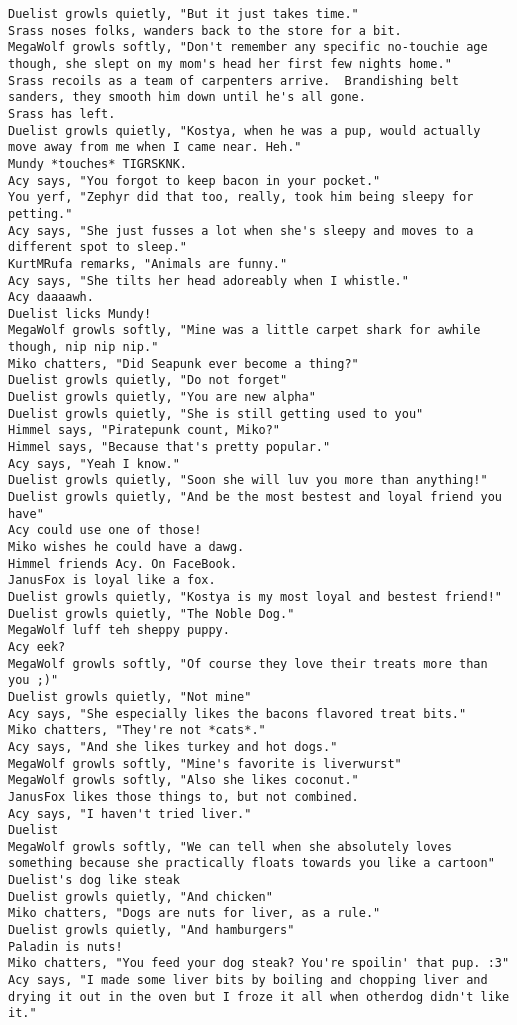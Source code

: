 \begin{verbatim}
Duelist growls quietly, "But it just takes time."
Srass noses folks, wanders back to the store for a bit.
MegaWolf growls softly, "Don't remember any specific no-touchie age though, she slept on my mom's head her first few nights home."
Srass recoils as a team of carpenters arrive.  Brandishing belt sanders, they smooth him down until he's all gone.
Srass has left.
Duelist growls quietly, "Kostya, when he was a pup, would actually move away from me when I came near. Heh."
Mundy *touches* TIGRSKNK.
Acy says, "You forgot to keep bacon in your pocket."
You yerf, "Zephyr did that too, really, took him being sleepy for petting."
Acy says, "She just fusses a lot when she's sleepy and moves to a different spot to sleep."
KurtMRufa remarks, "Animals are funny."
Acy says, "She tilts her head adoreably when I whistle."
Acy daaaawh.
Duelist licks Mundy!
MegaWolf growls softly, "Mine was a little carpet shark for awhile though, nip nip nip."
Miko chatters, "Did Seapunk ever become a thing?"
Duelist growls quietly, "Do not forget"
Duelist growls quietly, "You are new alpha"
Duelist growls quietly, "She is still getting used to you"
Himmel says, "Piratepunk count, Miko?"
Himmel says, "Because that's pretty popular."
Acy says, "Yeah I know."
Duelist growls quietly, "Soon she will luv you more than anything!"
Duelist growls quietly, "And be the most bestest and loyal friend you have"
Acy could use one of those!
Miko wishes he could have a dawg.
Himmel friends Acy. On FaceBook.
JanusFox is loyal like a fox.
Duelist growls quietly, "Kostya is my most loyal and bestest friend!"
Duelist growls quietly, "The Noble Dog."
MegaWolf luff teh sheppy puppy.
Acy eek?
MegaWolf growls softly, "Of course they love their treats more than you ;)"
Duelist growls quietly, "Not mine"
Acy says, "She especially likes the bacons flavored treat bits."
Miko chatters, "They're not *cats*."
Acy says, "And she likes turkey and hot dogs."
MegaWolf growls softly, "Mine's favorite is liverwurst"
MegaWolf growls softly, "Also she likes coconut."
JanusFox likes those things to, but not combined.
Acy says, "I haven't tried liver."
Duelist
MegaWolf growls softly, "We can tell when she absolutely loves something because she practically floats towards you like a cartoon"
Duelist's dog like steak
Duelist growls quietly, "And chicken"
Miko chatters, "Dogs are nuts for liver, as a rule."
Duelist growls quietly, "And hamburgers"
Paladin is nuts!
Miko chatters, "You feed your dog steak? You're spoilin' that pup. :3"
Acy says, "I made some liver bits by boiling and chopping liver and drying it out in the oven but I froze it all when otherdog didn't like it."

\end{verbatim}
